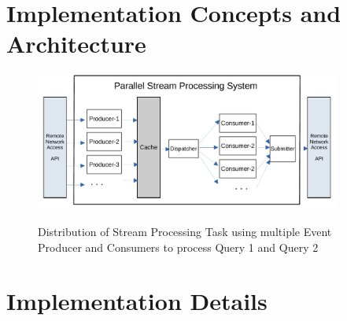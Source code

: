 \section{Implementation Concepts and Architecture}


\begin{figure}[!htb]
    \centering
    \includegraphics[width=0.9\textwidth]{./images/Parallel-Stream-Processing-System}
    \label{fig:parallel-srream-processing}
    \caption{Distribution of Stream Processing Task using multiple Event Producer and Consumers to process Query 1 and Query 2 }
\end{figure}



\section{Implementation Details}




